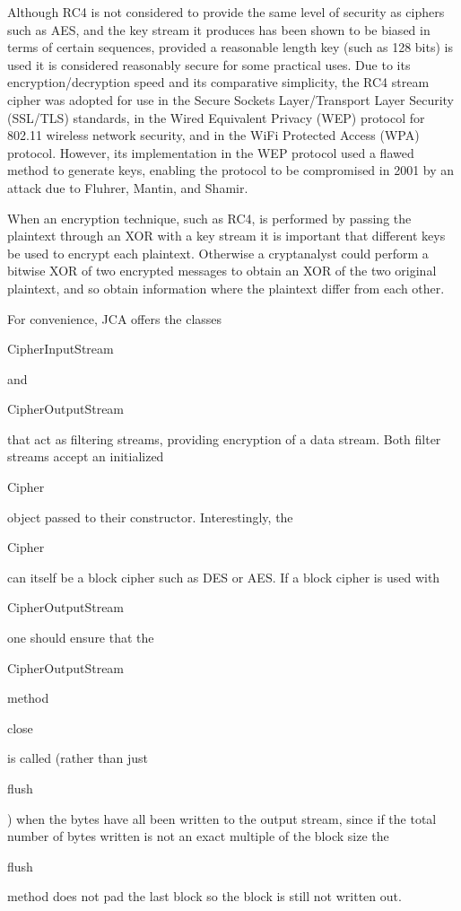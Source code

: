 Although RC4 is not considered to provide the same level of security
as ciphers such as AES, and the key stream it produces has been
shown to be biased in terms of certain sequences,
provided a reasonable length key (such as 128 bits)
is used it is considered reasonably secure for some practical uses.
Due to its encryption/decryption speed and its comparative simplicity,
the RC4 stream cipher was adopted for use in the
Secure Sockets Layer/Transport Layer Security (SSL/TLS) standards,
in the Wired Equivalent Privacy (WEP) protocol for 802.11 wireless network security,
and in the WiFi Protected Access (WPA) protocol.
However, its implementation in the WEP protocol used a flawed method to
generate keys, enabling the protocol to be compromised in 2001
by an attack due to Fluhrer, Mantin, and Shamir.

When an encryption technique, such as RC4, is performed by passing the plaintext through an XOR
with a key stream it is important that different keys be used to encrypt each plaintext.
Otherwise a cryptanalyst could perform a bitwise XOR of two encrypted messages to obtain
an XOR of the two original plaintext, and so obtain information where the plaintext differ
from each other.

For convenience, JCA offers the classes \begin{code}CipherInputStream\end{code}
and \begin{code}CipherOut\-putStream\end{code} that act as filtering streams,
providing encryption of a data stream.
Both filter streams accept an initialized \begin{code}Cipher\end{code} object passed
to their constructor. Interestingly, the \begin{code}Cipher\end{code} can itself
be a block cipher such as DES or AES.
If a block cipher is used with \begin{code}CipherOutputStream\end{code}
one should ensure that the \begin{code}CipherOutputStream\end{code} method
\begin{code}close\end{code} is called (rather than just \begin{code}flush\end{code}) when the
bytes have all been written to the output stream, since if the total number of bytes
written is not an exact multiple of the block size the \begin{code}flush\end{code}
method does not pad the last block so the block is still not written out.


